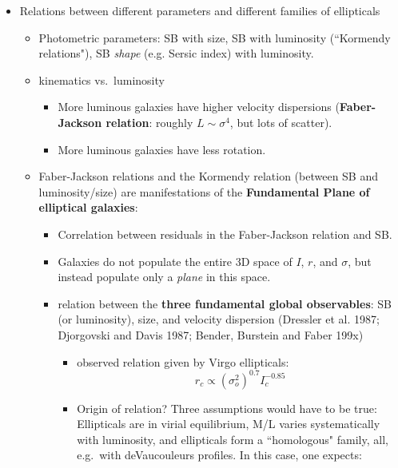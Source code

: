 \documentclass[12pt]{article}
\begin{document}
\begin{itemize}
  \item Relations between different parameters and different families
      of ellipticals
      \begin{itemize}
        \item Photometric parameters: SB with size, SB with luminosity (``Kormendy
        relations"), SB \textit{shape} (e.g. Sersic index) with luminosity.
        \item kinematics vs.\ luminosity
        \begin{itemize}
          \item More luminous galaxies have higher velocity dispersions
          (\textbf{Faber-Jackson relation}: roughly $L \sim \sigma^4$, but
          lots of scatter).
          \item More luminous galaxies have less rotation.
        \end{itemize}
        \item Faber-Jackson relations and the Kormendy relation (between
        SB and luminosity/size) are manifestations of the
        \textbf{Fundamental Plane of elliptical galaxies}:
        \begin{itemize}
          \item Correlation between residuals in the Faber-Jackson
          relation and SB.
          \item Galaxies do not populate the entire 3D space of $I$, $r$,
          and $\sigma$, but instead populate only a \textit{plane} in this
          space.
          \item relation between the \textbf{three fundamental global
          observables}: SB (or luminosity), size, and velocity dispersion
          (Dressler et al. 1987; Djorgovski and Davis 1987;
          Bender, Burstein and Faber 199x)
          \begin{itemize}
            \item observed relation given by Virgo ellipticals:
            \begin{equation}
               r_c \propto (\sigma_o^2)^{0.7}I_c^{-0.85}
            \end{equation}
            \item Origin of relation? Three assumptions would have to be
            true: Ellipticals are in virial equilibrium, M/L varies
            systematically with luminosity, and ellipticals form a
            ``homologous" family, all, e.g.\ with deVaucouleurs profiles.
            In this case, one expects:
            \begin{align*}

\end{align*}
\end{itemize}
\end{itemize}
\end{itemize}
\end{itemize}
\end{document}
